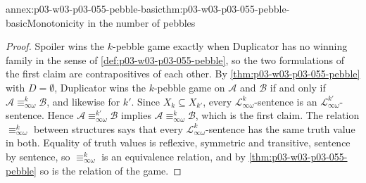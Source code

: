 \begin{annexitem}{annex:p03-w03-p03-055-pebble-basic}{thm:p03-w03-p03-055-pebble-basic}{Monotonicity in the number of pebbles}
\begin{proof}
Spoiler wins the \(k\)-pebble game exactly when Duplicator has no winning
family in the sense of \cref{def:p03-w03-p03-055-pebble}, so the two
formulations of the first claim are contrapositives of each other. By
\cref{thm:p03-w03-p03-055-pebble} with \(D=\emptyset\), Duplicator wins the
\(k\)-pebble game on \(\mathcal A\) and \(\mathcal B\) if and only if
\(\mathcal A\equiv^k_{\infty\omega}\mathcal B\), and likewise for \(k'\).
Since \(X_k\subseteq X_{k'}\), every \(\mathcal L^k_{\infty\omega}\)-sentence
is an \(\mathcal L^{k'}_{\infty\omega}\)-sentence. Hence
\(\mathcal A\equiv^{k'}_{\infty\omega}\mathcal B\) implies
\(\mathcal A\equiv^k_{\infty\omega}\mathcal B\), which is the first claim.
The relation \(\equiv^k_{\infty\omega}\) between structures says that every
\(\mathcal L^k_{\infty\omega}\)-sentence has the same truth value in both. Equality of truth values is
reflexive, symmetric and transitive, sentence by sentence, so
\(\equiv^k_{\infty\omega}\) is an equivalence relation, and by
\cref{thm:p03-w03-p03-055-pebble} so is the relation of the game.
\end{proof}
\end{annexitem}

